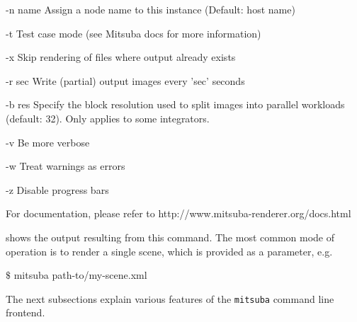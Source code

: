 \begin{console}[label=lst:mitsuba-cli,caption=Command line options of the \texttt{mitsuba} binary]
   -n name     Assign a node name to this instance (Default: host name)

   -t          Test case mode (see Mitsuba docs for more information)

   -x          Skip rendering of files where output already exists

   -r sec      Write (partial) output images every 'sec' seconds

   -b res      Specify the block resolution used to split images into parallel
               workloads (default: 32). Only applies to some integrators.

   -v          Be more verbose

   -w          Treat warnings as errors

   -z          Disable progress bars

 For documentation, please refer to http://www.mitsuba-renderer.org/docs.html
\end{console}
 shows the output resulting from this command. The most common
mode of operation is to render a single scene, which is provided as a parameter, e.g.
\begin{shell}
$\texttt{\$}$ mitsuba path-to/my-scene.xml
\end{shell}
The next subsections explain various features of the \texttt{mitsuba} command line frontend.
